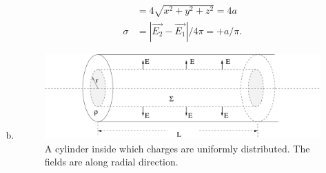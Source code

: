 \documentclass[solutions]{esg8022pset}
\begin{document}
\begin{enumerate}[(a)]
\begin{align*}
          & = 4\sqrt{x^2+y^2+z^2}=4a\\
        \sigma & = |\vec{E_2}-\vec{E_1}|/4\pi =+a/\pi.
      \end{align*}
    \item
    \begin{figure}[ht]
      \begin{center}
        \includegraphics[width=12cm]{ps02_sol_05}
        \caption{A cylinder inside which charges are uniformly
        distributed. The fields are along radial direction.}
        \label{fig:cylinder3}
      \end{center}
    \end{figure}


\end{enumerate}
\end{document}
